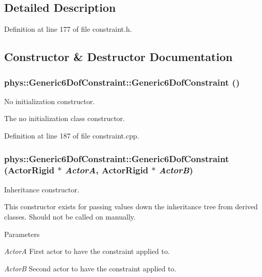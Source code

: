 \subsection{Detailed Description}


Definition at line 177 of file constraint.h.



\subsection{Constructor \& Destructor Documentation}
\hypertarget{classphys_1_1Generic6DofConstraint_ab897b1d7f04073cae60cf1d2615d04b4}{
\subsubsection[{Generic6DofConstraint}]{\setlength{\rightskip}{0pt plus 5cm}phys::Generic6DofConstraint::Generic6DofConstraint ()}}
\label{de/d2a/classphys_1_1Generic6DofConstraint_ab897b1d7f04073cae60cf1d2615d04b4}


No initialization constructor. 

The no initialization class constructor. 

Definition at line 187 of file constraint.cpp.

\hypertarget{classphys_1_1Generic6DofConstraint_aae8cea56ac1d384d326a089e48842cbc}{
\subsubsection[{Generic6DofConstraint}]{\setlength{\rightskip}{0pt plus 5cm}phys::Generic6DofConstraint::Generic6DofConstraint ({\bf ActorRigid} $\ast$ {\em ActorA}, \/  {\bf ActorRigid} $\ast$ {\em ActorB})}}
\label{de/d2a/classphys_1_1Generic6DofConstraint_aae8cea56ac1d384d326a089e48842cbc}


Inheritance constructor. 

This constructor exists for passing values down the inheritance tree from derived classes. Should not be called on manually. 
\begin{DoxyParams}{Parameters}
\item[{\em ActorA}]First actor to have the constraint applied to. \item[{\em ActorB}]Second actor to have the constraint applied to. \end{DoxyParams}


